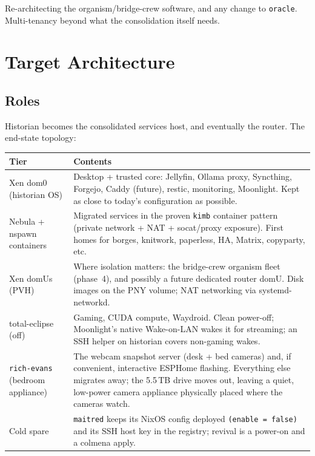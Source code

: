 \documentclass[11pt,letterpaper,headings=small]{scrartcl}
\newenvironment{note}[1][Note]{%
  \par\medskip\noindent{\small\bfseries #1.}\begin{small}\par\nopagebreak
}{\end{small}\par\medskip}
\begin{document}
\begin{note}[Non-goals]
Re-architecting the organism/bridge-crew software, and any change to
\texttt{oracle}. Multi-tenancy beyond what the consolidation itself needs.
\end{note}

\section{Target Architecture}

\subsection{Roles}

Historian becomes the consolidated services host, and eventually the
router. The end-state topology:

\begin{center}
\small
\begin{tabular}{@{}lp{4.4in}@{}}
\toprule
\textbf{Tier} & \textbf{Contents} \\
\midrule
Xen dom0 (historian OS) &
Desktop + trusted core: Jellyfin, Ollama proxy, Syncthing, Forgejo,
Caddy (future), restic, monitoring, Moonlight. Kept as close to
today's configuration as possible. \\
Nebula + nspawn containers &
Migrated services in the proven \texttt{kimb} container pattern
(private network + NAT + socat/proxy exposure). First homes for
borges, knitwork, paperless, HA, Matrix, copyparty, etc. \\
Xen domUs (PVH) &
Where isolation matters: the bridge-crew organism fleet (phase~4),
and possibly a future dedicated router domU. Disk images on the PNY
volume; NAT networking via systemd-networkd. \\
total-eclipse (off) &
Gaming, CUDA compute, Waydroid. Clean power-off; Moonlight's native
Wake-on-LAN wakes it for streaming; an SSH helper on historian covers
non-gaming wakes. \\
\addlinespace
\texttt{rich-evans} (bedroom appliance) &
The webcam snapshot server (desk + bed cameras) and, if convenient,
interactive ESPHome flashing. Everything else migrates away; the
5.5\,TB drive moves out, leaving a quiet, low-power camera appliance
physically placed where the cameras watch. \\
\addlinespace
Cold spare &
\texttt{maitred} keeps its NixOS config deployed \texttt{(enable =
false)} and its SSH host key in the registry; revival is a power-on
and a colmena apply. \\
\bottomrule
\end{tabular}
\end{center}
\end{document}
